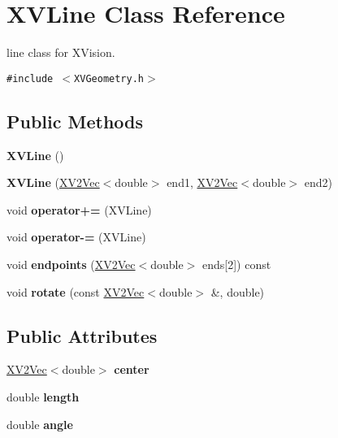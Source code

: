 \hypertarget{class_XVLine}{
\section{XVLine  Class Reference}
\label{XVLine}
}
line class for XVision. 


{\tt \#include $<$XVGeometry.h$>$}

\subsection*{Public Methods}
\begin{CompactItemize}
\item 
{\bf XVLine} ()
\item 
\label{XVLine_a1}
\hypertarget{class_XVLine_a1}{
{\bf XVLine} (\hyperlink{class_XV2Vec}{XV2Vec}$<$double$>$ end1, \hyperlink{class_XV2Vec}{XV2Vec}$<$double$>$ end2)}

\item 
\label{XVLine_a2}
\hypertarget{class_XVLine_a2}{
void {\bf operator+=} (XVLine)}

\item 
\label{XVLine_a3}
\hypertarget{class_XVLine_a3}{
void {\bf operator-=} (XVLine)}

\item 
\label{XVLine_a4}
\hypertarget{class_XVLine_a4}{
void {\bf endpoints} (\hyperlink{class_XV2Vec}{XV2Vec}$<$double$>$ ends\mbox{[}2\mbox{]}) const}

\item 
\label{XVLine_a5}
\hypertarget{class_XVLine_a5}{
void {\bf rotate} (const \hyperlink{class_XV2Vec}{XV2Vec}$<$double$>$ \&, double)}

\end{CompactItemize}
\subsection*{Public Attributes}
\begin{CompactItemize}
\item 
\hyperlink{class_XV2Vec}{XV2Vec}$<$double$>$ {\bf center}
\item 
double {\bf length}
\item 
double {\bf angle}
\end{CompactItemize}


